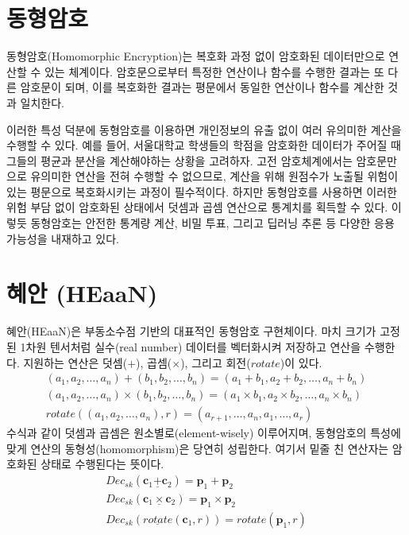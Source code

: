 \documentclass[a4paper, 11pt, chapterprefix=false]{report}
\newcommand{\ud}{\underline}
\renewcommand{\vec}{\mathbf}
\newcommand{\htimes}{\ud{\times}}
\newcommand{\hplus}{\ud{+}}
\newcommand{\hrotate}{\ud{rotate}}
\begin{document}
\section{동형암호}

동형암호(Homomorphic Encryption)는 복호화 과정 없이 암호화된 데이터만으로 연산할
수 있는 체계이다. 암호문으로부터 특정한 연산이나 함수를 수행한 결과는 또 다른
암호문이 되며, 이를 복호화한 결과는 평문에서 동일한 연산이나 함수를 계산한 것과
일치한다.

이러한 특성 덕분에 동형암호를 이용하면 개인정보의 유출 없이 여러 유의미한 계산을
수행할 수 있다. 예를 들어, 서울대학교 학생들의 학점을 암호화한 데이터가 주어질
때 그들의 평균과 분산을 계산해야하는 상황을 고려하자. 고전 암호체계에서는
암호문만으로 유의미한 연산을 전혀 수행할 수 없으므로, 계산을 위해 원점수가
노출될 위험이 있는 평문으로 복호화시키는 과정이 필수적이다. 하지만 동형암호를
사용하면 이러한 위험 부담 없이 암호화된 상태에서 덧셈과 곱셈 연산으로 통계치를
획득할 수 있다. 이렇듯 동형암호는 안전한 통계량 계산, 비밀 투표, 그리고 딥러닝
추론 등 다양한 응용 가능성을 내재하고 있다.

\section{혜안 (HEaaN)}

혜안(HEaaN)은 부동소수점 기반의 대표적인 동형암호 구현체이다. \cite{heaan2017}
마치 크기가 고정된 1차원 텐서처럼 실수(real number) 데이터를 벡터화시켜 저장하고
연산을 수행한다.  지원하는 연산은 덧셈($+$), 곱셈($\times$), 그리고
회전($rotate$)이 있다.
\begin{gather*}
    (a_1, a_2, \dots, a_n) + (b_1, b_2, \dots, b_n) = (a_1 + b_1, a_2 + b_2, \dots, a_n + b_n) \\
    (a_1, a_2, \dots, a_n) \times (b_1, b_2, \dots, b_n) = (a_1 \times b_1, a_2 \times b_2, \dots, a_n \times b_n) \\
    rotate((a_1, a_2, \dots, a_n), r) = (a_{r+1}, \dots, a_n, a_1, \dots, a_r)
\end{gather*}
수식과 같이 덧셈과 곱셈은 원소별로(element-wisely) 이루어지며, 동형암호의 특성에
맞게 연산의 동형성(homomorphism)은 당연히 성립한다. 여기서 밑줄 친 연산자는
암호화된 상태로 수행된다는 뜻이다.
\begin{gather*}
    Dec_{sk}(\vec c_1 \hplus \vec c_2) = \vec p_1 + \vec p_2 \\
    Dec_{sk}(\vec c_1 \htimes \vec c_2) = \vec p_1 \times \vec p_2 \\
    Dec_{sk}(\hrotate(\vec c_1, r)) = rotate(\vec p_1, r)
\end{gather*}
\end{document}

